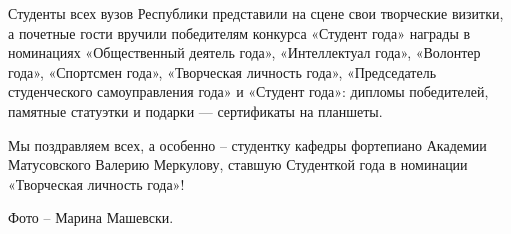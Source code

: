 Студенты всех вузов Республики представили на сцене свои творческие визитки, а
почетные гости вручили победителям конкурса «Студент года» награды в номинациях
«Общественный деятель года», «Интеллектуал года», «Волонтер года», «Спортсмен
года», «Творческая личность года», «Председатель студенческого самоуправления
года» и «Студент года»: дипломы победителей, памятные статуэтки и подарки —
сертификаты на планшеты.


Мы поздравляем всех, а особенно – студентку кафедры фортепиано Академии
Матусовского Валерию Меркулову, ставшую Студенткой года в номинации «Творческая
личность года»!

Фото – Марина Машевски.


